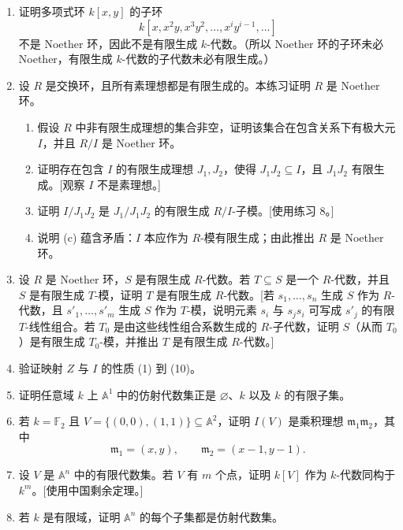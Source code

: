 \begin{enumerate}[label=\arabic*.]
	\item 证明多项式环 $k[x,y]$ 的子环
	\[
	k[x,x^2y,x^3y^2,
	\ldots,x^iy^{i-1},
	\ldots]
	\]
	不是 Noether 环，因此不是有限生成 $k$-代数。（所以 Noether 环的子环未必 Noether，有限生成 $k$-代数的子代数未必有限生成。）
	
	\item 设 $R$ 是交换环，且所有素理想都是有限生成的。本练习证明 $R$ 是 Noether 环。
	\begin{enumerate}[label=(\alph*)]
		\item 假设 $R$ 中非有限生成理想的集合非空，证明该集合在包含关系下有极大元 $I$，并且 $R/I$ 是 Noether 环。
		\item 证明存在包含 $I$ 的有限生成理想 $J_1,J_2$，使得 $J_1J_2\subseteq I$，且 $J_1J_2$ 有限生成。[观察 $I$ 不是素理想。]
		\item 证明 $I/J_1J_2$ 是 $J_1/J_1J_2$ 的有限生成 $R/I$-子模。[使用练习 8。]
		\item 说明 (c) 蕴含矛盾：$I$ 本应作为 $R$-模有限生成；由此推出 $R$ 是 Noether 环。
	\end{enumerate}
	
	\item 设 $R$ 是 Noether 环，$S$ 是有限生成 $R$-代数。若 $T\subseteq S$ 是一个 $R$-代数，并且 $S$ 是有限生成 $T$-模，证明 $T$ 是有限生成 $R$-代数。[若 $s_1,
	\ldots,s_n$ 生成 $S$ 作为 $R$-代数，且 $s'_1,
	\ldots,s'_m$ 生成 $S$ 作为 $T$-模，说明元素 $s_i$ 与 $s_js_i$ 可写成 $s'_j$ 的有限 $T$-线性组合。若 $T_0$ 是由这些线性组合系数生成的 $R$-子代数，证明 $S$（从而 $T_0$）是有限生成 $T_0$-模，并推出 $T$ 是有限生成 $R$-代数。]
	
	\item 验证映射 $Z$ 与 $I$ 的性质 (1) 到 (10)。
	
	\item 证明任意域 $k$ 上 $\mathbb A^1$ 中的仿射代数集正是 $\varnothing$、$k$ 以及 $k$ 的有限子集。
	
	\item 若 $k=\mathbb F_2$ 且 $V=\{(0,0),(1,1)\}\subseteq\mathbb A^2$，证明 $I(V)$ 是乘积理想 $\mathfrak m_1\mathfrak m_2$，其中
	\[
	\mathfrak m_1=(x,y),
	\qquad
	\mathfrak m_2=(x-1,y-1).
	\]
	
	\item 设 $V$ 是 $\mathbb A^n$ 中的有限代数集。若 $V$ 有 $m$ 个点，证明 $k[V]$ 作为 $k$-代数同构于 $k^m$。[使用中国剩余定理。]
	
	\item 若 $k$ 是有限域，证明 $\mathbb A^n$ 的每个子集都是仿射代数集。
	

\end{enumerate}
